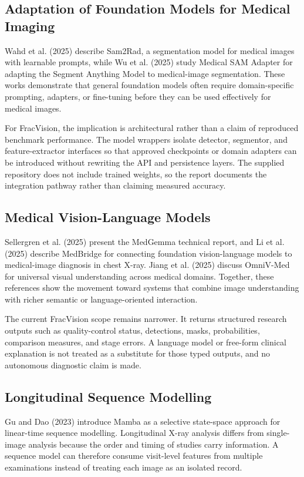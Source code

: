 \documentclass[12pt,a4paper]{article}
\begin{document}
\subsection{Adaptation of Foundation Models for Medical Imaging}
Wahd et al. (2025) describe Sam2Rad, a segmentation model for medical images with learnable prompts, while Wu et al. (2025) study Medical SAM Adapter for adapting the Segment Anything Model to medical-image segmentation. These works demonstrate that general foundation models often require domain-specific prompting, adapters, or fine-tuning before they can be used effectively for medical images.

For FracVision, the implication is architectural rather than a claim of reproduced benchmark performance. The model wrappers isolate detector, segmentor, and feature-extractor interfaces so that approved checkpoints or domain adapters can be introduced without rewriting the API and persistence layers. The supplied repository does not include trained weights, so the report documents the integration pathway rather than claiming measured accuracy.

\subsection{Medical Vision-Language Models}
Sellergren et al. (2025) present the MedGemma technical report, and Li et al. (2025) describe MedBridge for connecting foundation vision-language models to medical-image diagnosis in chest X-ray. Jiang et al. (2025) discuss OmniV-Med for universal visual understanding across medical domains. Together, these references show the movement toward systems that combine image understanding with richer semantic or language-oriented interaction.

The current FracVision scope remains narrower. It returns structured research outputs such as quality-control status, detections, masks, probabilities, comparison measures, and stage errors. A language model or free-form clinical explanation is not treated as a substitute for those typed outputs, and no autonomous diagnostic claim is made.

\subsection{Longitudinal Sequence Modelling}
Gu and Dao (2023) introduce Mamba as a selective state-space approach for linear-time sequence modelling. Longitudinal X-ray analysis differs from single-image analysis because the order and timing of studies carry information. A sequence model can therefore consume visit-level features from multiple examinations instead of treating each image as an isolated record.
\end{document}
